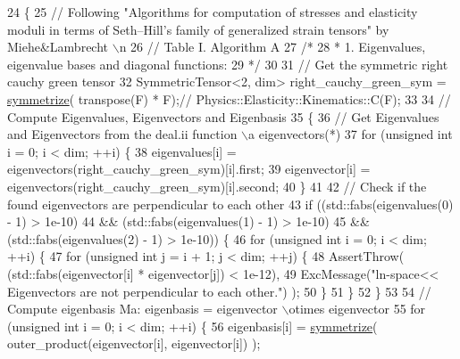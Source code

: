 \begin{DoxyCode}
24     \{
25         \textcolor{comment}{// Following "Algorithms for computation of stresses and elasticity moduli in terms of Seth–Hill’s
       family of generalized strain tensors" by Miehe&Lambrecht \(\backslash\)n}
26         \textcolor{comment}{// Table I. Algorithm A}
27         \textcolor{comment}{/*}
28 \textcolor{comment}{         * 1. Eigenvalues, eigenvalue bases and diagonal functions:}
29 \textcolor{comment}{         */}
30     
31         \textcolor{comment}{// Get the symmetric right cauchy green tensor}
32          SymmetricTensor<2, dim> right\_cauchy\_green\_sym = \hyperlink{functions_8h_afe83e9509497294b7f662b800b6b91ff}{symmetrize}( transpose(F) * F);\textcolor{comment}{//
      Physics::Elasticity::Kinematics::C(F);}
33     
34         \textcolor{comment}{// Compute Eigenvalues, Eigenvectors and Eigenbasis}
35          \{
36             \textcolor{comment}{// Get Eigenvalues and Eigenvectors from the deal.ii function \(\backslash\)a eigenvectors(*)}
37             \textcolor{keywordflow}{for} (\textcolor{keywordtype}{unsigned} \textcolor{keywordtype}{int} i = 0; i < dim; ++i) \{
38                 eigenvalues[i] = eigenvectors(right\_cauchy\_green\_sym)[i].first;
39                 eigenvector[i] = eigenvectors(right\_cauchy\_green\_sym)[i].second;
40             \}
41     
42             \textcolor{comment}{// Check if the found eigenvectors are perpendicular to each other}
43             \textcolor{keywordflow}{if} ((std::fabs(eigenvalues(0) - 1) > 1e-10)
44                 && (std::fabs(eigenvalues(1) - 1) > 1e-10)
45                 && (std::fabs(eigenvalues(2) - 1) > 1e-10)) \{
46                 \textcolor{keywordflow}{for} (\textcolor{keywordtype}{unsigned} \textcolor{keywordtype}{int} i = 0; i < dim; ++i) \{
47                     \textcolor{keywordflow}{for} (\textcolor{keywordtype}{unsigned} \textcolor{keywordtype}{int} j = i + 1; j < dim; ++j) \{
48                         AssertThrow( (std::fabs(eigenvector[i] * eigenvector[j]) < 1e-12),
49                                      ExcMessage(\textcolor{stringliteral}{"ln-space<< Eigenvectors are not perpendicular to each
       other."}) );
50                     \}
51                 \}
52             \}
53     
54             \textcolor{comment}{// Compute eigenbasis Ma: eigenbasis = eigenvector \(\backslash\)otimes eigenvector}
55             \textcolor{keywordflow}{for} (\textcolor{keywordtype}{unsigned} \textcolor{keywordtype}{int} i = 0; i < dim; ++i) \{
56                 eigenbasis[i] = \hyperlink{functions_8h_afe83e9509497294b7f662b800b6b91ff}{symmetrize}( outer\_product(eigenvector[i], eigenvector[i]) );

\end{DoxyCode}
